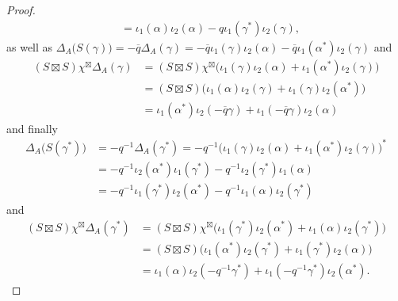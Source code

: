 \documentclass[12pt,reqno,a4paper]{amsart}
\theoremstyle{definition}
\numberwithin{equation}{section}
\begin{document}
\begin{proof}
\begin{align*}
&=\iota_1(\alpha)\iota_2(\alpha)-q\iota_1(\gamma^*)\iota_2(\gamma),
\end{align*}
as well as $\Delta_A\bigl(S(\gamma)\bigr)
=-\overline{q}\Delta_A(\gamma)=-\overline{q}\iota_1(\gamma)\iota_2(\alpha)
-\overline{q}\iota_1(\alpha^*)\iota_2(\gamma)$ and
\begin{align*}
(S\boxtimes S)\chi^{\boxtimes}\Delta_A(\gamma)
&=(S\boxtimes S)\chi^{\boxtimes}\bigl(\iota_1(\gamma)\iota_2(\alpha)+\iota_1(\alpha^*)\iota_2(\gamma)\bigr)\\
&=(S\boxtimes S)\bigl(\iota_1(\alpha)\iota_2(\gamma)+\iota_1(\gamma)\iota_2(\alpha^*)\bigr)\\
&=\iota_1(\alpha^*)\iota_2(-\overline{q}\gamma)+\iota_1(-\overline{q}\gamma)\iota_2(\alpha)
\end{align*}
and finally
\begin{align*}
\Delta_A\bigl(S(\gamma^*)\bigr)
&=-q^{-1}\Delta_A(\gamma^*)
=-q^{-1}\bigl(\iota_1(\gamma)\iota_2(\alpha)+\iota_1(\alpha^*)\iota_2(\gamma)\bigr)^*\\
&=-q^{-1}\iota_2(\alpha^*)\iota_1(\gamma^*)-q^{-1}\iota_2(\gamma^*)\iota_1(\alpha)\\
&=-q^{-1}\iota_1(\gamma^*)\iota_2(\alpha^*)-q^{-1} \iota_1(\alpha)\iota_2(\gamma^*)
\end{align*}
and
\begin{align*}
(S\boxtimes S)\chi^{\boxtimes}\Delta_A(\gamma^*)
&=(S\boxtimes S)\chi^{\boxtimes}\bigl(\iota_1(\gamma^*)\iota_2(\alpha^*)+\iota_1(\alpha)\iota_2(\gamma^*)\bigr)\\
&=(S\boxtimes S)\bigl(\iota_1(\alpha^*)\iota_2(\gamma^*)+\iota_1(\gamma^*)\iota_2(\alpha)\bigr)\\
&=\iota_1(\alpha)\iota_2(-q^{-1}\gamma^*)+\iota_1(-q^{-1}\gamma^*)\iota_2(\alpha^*).
\end{align*}


\end{proof}
\end{document}
